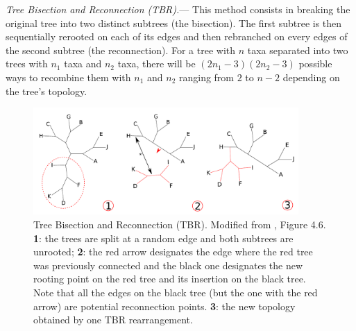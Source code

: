 \documentclass[12pt,letterpaper]{article}
\renewcommand{\subsubsection}[1]{%
\vspace{2ex}
\noindent
\textit{#1.}---}
\begin{document}
\subsubsection{Tree Bisection and Reconnection (TBR)}
This method consists in breaking the original tree into two distinct subtrees (the bisection).
The first subtree is then sequentially rerooted on each of its edges and then rebranched on every edges of the second subtree (the reconnection).
For a tree with $n$ taxa separated into two trees with $n_{1}$ taxa and $n_{2}$ taxa, there will be $(2n_{1}-3)(2n_{2}-3)$ possible ways to recombine them \citep{felsenstein2004inferring} with $n_{1}$ and $n_{2}$ ranging from $2$ to $n-2$ depending on the tree's topology.


\begin{figure}[!htbp]
\centering
   \includegraphics[width=0.9\textwidth]{Figure/TBR.pdf}
\caption{Tree Bisection and Reconnection (TBR). Modified from \cite{felsenstein2004inferring}, Figure 4.6. \textbf{1}: the trees are split at a random edge and both subtrees are unrooted; \textbf{2}: the red arrow designates the edge where the red tree was previously connected and the black one designates the new rooting point on the red tree and its insertion on the black tree. Note that all the edges on the black tree (but the one with the red arrow) are potential reconnection points. \textbf{3}: the new topology obtained by one TBR rearrangement.}
\label{Figure_TBR}
\end{figure}
\end{document}
